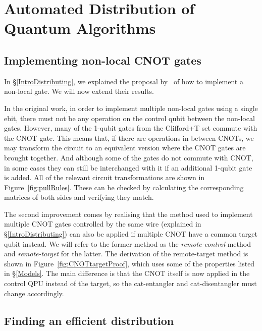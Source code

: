 \chapter{Automated Distribution of Quantum Algorithms}
\label{chap:Project}

\section{Implementing non-local CNOT gates}
\label{NonLocalGates}

In \S\ref{IntroDistributing}, we explained the proposal by~\citet{NonLocalCNOT} of how to implement a non-local gate. We will now extend their results.

In the original work, in order to implement multiple non-local gates using a single ebit, there must not be any operation on the control qubit between the non-local gates. However, many of the 1-qubit gates from the Clifford+T set commute with the CNOT gate. This means that, if there are operations in between CNOTs, we may transform the circuit to an equivalent version where the CNOT gates are brought together. And although some of the gates do not commute with CNOT, in some cases they can still be interchanged with it if an additional 1-qubit gate is added. All of the relevant circuit transformations are shown in Figure~\ref{fig:pullRules}. These can be checked by calculating the corresponding matrices of both sides and verifying they match.



The second improvement comes by realising that the method used to implement multiple CNOT gates controlled by the same wire (explained in \S\ref{IntroDistributing}) can also be applied if multiple CNOT have a common target qubit instead. We will refer to the former method as the \textit{remote-control} method and \textit{remote-target} for the latter. The derivation of the remote-target method is shown in Figure~\ref{fig:CNOTtargetProof}, which uses some of the properties listed in \S\ref{Models}. The main difference is that the CNOT itself is now applied in the control QPU instead of the target, so the cat-entangler and cat-disentangler must change accordingly.



\section{Finding an efficient distribution}
\label{EfficientDistrib}

